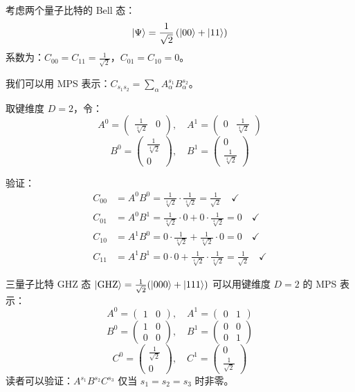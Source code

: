 \documentclass[12pt,a4paper]{ctexart}
\begin{document}
\begin{examplebox}
考虑两个量子比特的 Bell 态：
\[
\ket{\Psi} = \frac{1}{\sqrt{2}}\left(\ket{00} + \ket{11}\right)
\]
系数为：$C_{00} = C_{11} = \frac{1}{\sqrt{2}}$，$C_{01} = C_{10} = 0$。

我们可以用 MPS 表示：$C_{s_1 s_2} = \sum_\alpha A^{s_1}_\alpha B^{s_2}_\alpha$。

取键维度 $D=2$，令：
\[
A^{0} = \begin{pmatrix} \frac{1}{\sqrt[4]{2}} & 0 \end{pmatrix}, \quad
A^{1} = \begin{pmatrix} 0 & \frac{1}{\sqrt[4]{2}} \end{pmatrix}
\]
\[
B^{0} = \begin{pmatrix} \frac{1}{\sqrt[4]{2}} \\ 0 \end{pmatrix}, \quad
B^{1} = \begin{pmatrix} 0 \\ \frac{1}{\sqrt[4]{2}} \end{pmatrix}
\]

验证：
\begin{align}
C_{00} &= A^0 B^0 = \frac{1}{\sqrt[4]{2}} \cdot \frac{1}{\sqrt[4]{2}} = \frac{1}{\sqrt{2}} \quad \checkmark \\
C_{01} &= A^0 B^1 = \frac{1}{\sqrt[4]{2}} \cdot 0 + 0 \cdot \frac{1}{\sqrt[4]{2}} = 0 \quad \checkmark \\
C_{10} &= A^1 B^0 = 0 \cdot \frac{1}{\sqrt[4]{2}} + \frac{1}{\sqrt[4]{2}} \cdot 0 = 0 \quad \checkmark \\
C_{11} &= A^1 B^1 = 0 \cdot 0 + \frac{1}{\sqrt[4]{2}} \cdot \frac{1}{\sqrt[4]{2}} = \frac{1}{\sqrt{2}} \quad \checkmark
\end{align}
\end{examplebox}

\begin{examplebox}[例10：GHZ态的MPS表示]
三量子比特 GHZ 态 $\ket{\text{GHZ}} = \frac{1}{\sqrt{2}}(\ket{000} + \ket{111})$ 可以用键维度 $D=2$ 的 MPS 表示：
\[
A^{0} = \begin{pmatrix} 1 & 0 \end{pmatrix}, \quad A^{1} = \begin{pmatrix} 0 & 1 \end{pmatrix}
\]
\[
B^{0} = \begin{pmatrix} 1 & 0 \\ 0 & 0 \end{pmatrix}, \quad B^{1} = \begin{pmatrix} 0 & 0 \\ 0 & 1 \end{pmatrix}
\]
\[
C^{0} = \begin{pmatrix} \frac{1}{\sqrt{2}} \\ 0 \end{pmatrix}, \quad C^{1} = \begin{pmatrix} 0 \\ \frac{1}{\sqrt{2}} \end{pmatrix}
\]
读者可以验证：$A^{s_1} B^{s_2} C^{s_3}$ 仅当 $s_1 = s_2 = s_3$ 时非零。
\end{examplebox}
\end{document}
